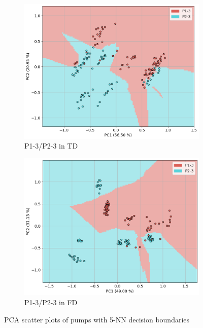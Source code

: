 \documentclass{llncs}
\begin{document}
\begin{figure}[h]
\begin{subfigure}[b]{0.24\textwidth}
         \centering
         \includegraphics[width=\textwidth]{fig/scatter-pumps/binary-td.png}
         \caption{P1-3/P2-3 in TD}
     \end{subfigure}
     \hfill
     \begin{subfigure}[b]{0.24\textwidth}
         \centering
         \includegraphics[width=\textwidth]{fig/scatter-pumps/binary-fd.png}
         \caption{P1-3/P2-3 in FD}
     \end{subfigure}
     \caption{PCA scatter plots of pumps with 5-NN decision boundaries}
     \label{fig:pump-scatter}
\end{figure}
\end{document}
